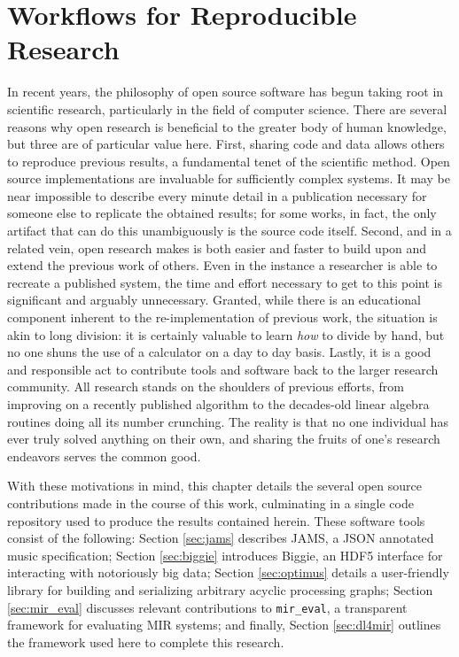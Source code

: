 

\graphicspath{{7/figures/}}

\chapter{Workflows for Reproducible Research}
\label{chp:reproducibility}

In recent years, the philosophy of open source software has begun taking root in scientific research, particularly in the field of computer science.
There are several reasons why open research is beneficial to the greater body of human knowledge, but three are of particular value here.
First, sharing code and data allows others to reproduce previous results, a fundamental tenet of the scientific method.
Open source implementations are invaluable for sufficiently complex systems.
It may be near impossible to describe every minute detail in a publication necessary for someone else to replicate the obtained results;
for some works, in fact, the only artifact that can do this unambiguously is the source code itself.
Second, and in a related vein, open research makes is both easier and faster to build upon and extend the previous work of others.
Even in the instance a researcher is able to recreate a published system, the time and effort necessary to get to this point is significant and arguably unnecessary.
Granted, while there is an educational component inherent to the re-implementation of previous work, the situation is akin to long division:
it is certainly valuable to learn \emph{how} to divide by hand, but no one shuns the use of a calculator on a day to day basis.
Lastly, it is a good and responsible act to contribute tools and software back to the larger research community.
All research stands on the shoulders of previous efforts, from improving on a recently published algorithm to the decades-old linear algebra routines doing all its number crunching.
The reality is that no one individual has ever truly solved anything on their own, and sharing the fruits of one's research endeavors serves the common good.

With these motivations in mind, this chapter details the several open source contributions made in the course of this work, culminating in a single code repository used to produce the results contained herein.
These software tools consist of the following:
Section \ref{sec:jams} describes JAMS, a JSON annotated music specification;
Section \ref{sec:biggie} introduces Biggie, an HDF5 interface for interacting with notoriously big data;
Section \ref{sec:optimus} details a user-friendly library for building and serializing arbitrary acyclic processing graphs;
Section \ref{sec:mir_eval} discusses relevant contributions to \texttt{mir\_eval}, a transparent framework for evaluating MIR systems;
and finally, Section \ref{sec:dl4mir} outlines the framework used here to complete this research.


